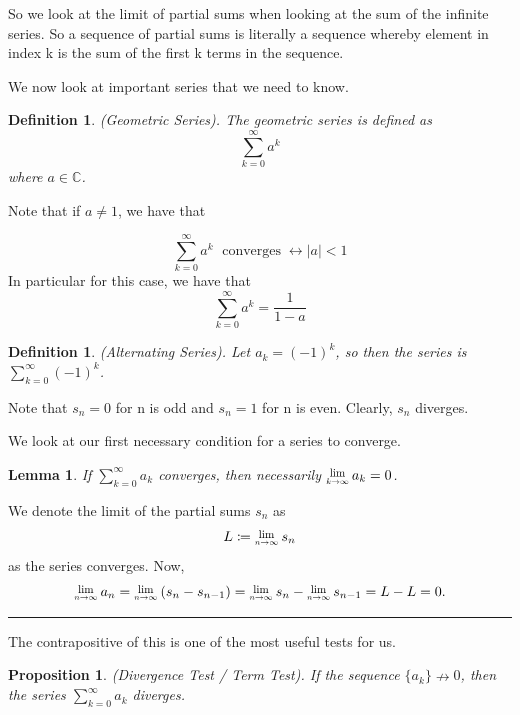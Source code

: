 \documentclass[twoside]{article}
\newcommand{\Lim}[1]{\raisebox{0.5ex}{\scalebox{0.8}{$\displaystyle \lim_{#1}\;$}}}
\newtheorem{lemma}[theorem]{Lemma}
\newtheorem{proposition}[theorem]{Proposition}
\newtheorem{definition}[theorem]{Definition}
\newenvironment{proof}{{\bf Proof:}}{\hfill\rule{2mm}{2mm}}
\begin{document}
So we look at the limit of partial sums when looking at the sum of the infinite series. So a sequence of partial sums is literally a sequence whereby element in index k is the sum of the first k terms in the sequence.

\bigskip

We now look at important series that we need to know.

\begin{definition}(Geometric Series). 
The geometric series is defined as $$\sum_{k=0}^{\infty}a^k$$ where $a \in \mathbb{C}$. 
\end{definition}

Note that if $a \neq 1$, we have that

$$\sum_{k=0}^{\infty}a^k \; \text{ converges} \; \leftrightarrow |a| < 1 $$
In particular for this case, we have that 
$$
\sum_{k=0}^{\infty}a^k = \frac{1}{1 - a} 
$$

\bigskip

\begin{definition}
(Alternating Series). Let $a_k = (-1)^k$, so then the series is $\sum_{k=0}^{\infty}(-1)^k$. 
\end{definition}

Note that $s_n = 0$ for n is odd and $s_n = 1$ for n is even. Clearly, $s_n$ diverges. 

\bigskip

We look at our first necessary condition for a series to converge.

\begin{lemma}
If $\sum_{k=0}^{\infty}a_k$ converges, then necessarily $\Lim{k \rightarrow \infty}a_k = 0$.
\end{lemma}

\begin{proof} We denote the limit of the partial sums $s_n$ as
$$
L \coloneqq \Lim{n \rightarrow \infty}s_n
$$
as the series converges. Now,
$$
\Lim{n \rightarrow \infty}a_n = \Lim{n \rightarrow \infty}(s_n - s_{n-1}) = \Lim{n \rightarrow \infty}s_n - \Lim{n \rightarrow \infty}s_{n-1} = L - L = 0. 
$$
\end{proof}

The contrapositive of this is one of the most useful tests for us.
\begin{proposition}
(Divergence Test / Term Test). If the sequence $\{a_k\} \nrightarrow 0$, then the series $\sum_{k=0}^{\infty}a_k$ diverges.
\end{proposition}
\end{document}
